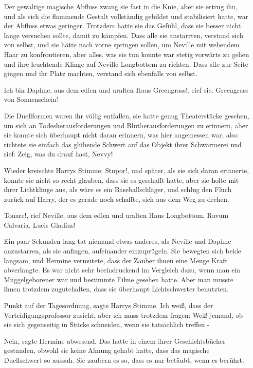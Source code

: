 Der gewaltige magische Abfluss zwang sie fast in die Knie, aber sie ertrug ihn,
und als sich die flammende Gestalt vollständig gebildet und stabilisiert hatte,
war der Abfluss etwas geringer. Trotzdem hatte sie das Gefühl, dass sie besser
nicht lange versuchen sollte, damit zu kämpfen. Dass alle sie anstarrten,
verstand sich von selbst, und sie hätte nach vorne springen sollen, um Neville
mit wehendem Haar zu konfrontieren, aber alles, was sie tun konnte war stetig
vorwärts zu gehen und ihre leuchtende Klinge auf Neville Longbottom zu richten.
Dass alle zur Seite gingen und ihr Platz machten, verstand sich ebenfalls von
selbst.

\glqq Ich bin Daphne, aus dem edlen und uralten Haus Greengrass!\grqq{}, rief
sie. \glqq Greengrass von Sonnenschein!\grqq{}

Die Duellformen waren ihr völlig entfallen, sie hatte genug Theaterstücke
gesehen, um sich an Todesherausforderungen und Blutherausforderungen zu
erinnern, aber sie konnte sich überhaupt nicht daran erinnern, was hier
angemessen war, also richtete sie einfach das glühende Schwert auf das Objekt
ihrer Schwärmerei und rief: \glqq Zeig, was du drauf hast, Nevvy!\grqq{}

Wieder kreischte Harrys Stimme: \glqq Stupor!\grqq{}, und später, als sie sich
daran erinnerte, konnte sie nicht so recht glauben, dass sie es geschafft hatte,
aber sie holte mit ihrer Lichtklinge aus, als wäre es ein Baseballschläger, und
schlug den Fluch zurück auf Harry, der es gerade noch schaffte, sich aus dem Weg
zu drehen.

\glqq Tonare!\grqq{}, rief Neville, aus dem edlen und uralten Haus Longbottom.
\glqq Ravum Calvaria, Lucis Gladius!\grqq{}

Ein paar Sekunden lang tat niemand etwas anderes, als Neville und Daphne
anzustarren, als sie anfingen, aufeinander einzuprügeln. Sie bewegten sich beide
langsam, und Hermine vermutete, dass der Zauber ihnen eine Menge Kraft
abverlangte. Es war nicht sehr beeindruckend im Vergleich dazu, wenn man ein
Muggelgeborener war und bestimmte Filme gesehen hatte. Aber man musste ihnen
trotzdem zugutehalten, dass sie überhaupt Lichtschwerter benutzten.

\glqq Punkt auf der Tagesordnung\grqq{}, sagte Harrys Stimme. \glqq Ich weiß,
dass der Verteidigungsprofessor zusieht, aber ich muss trotzdem fragen: Weiß
jemand, ob sie sich gegenseitig in Stücke schneiden, wenn sie tatsächlich
treffen -\grqq{}

\glqq Nein\grqq{}, sagte Hermine abwesend. Das hatte in einem ihrer
Geschichtsbücher gestanden, obwohl sie keine Ahnung gehabt hatte, dass das
magische Duellschwert so aussah. \glqq Sie zaubern es so, dass es nur betäubt,
wenn es berührt.\grqq{}

